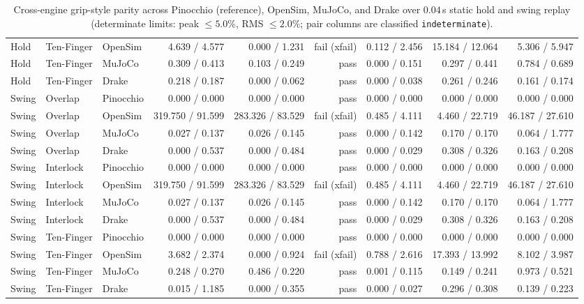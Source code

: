 \documentclass[11pt,a4paper]{article}
\begin{document}
\begin{table}[htbp]
\begin{tabular}{lllrrrrrr}
Hold & Ten-Finger & OpenSim & 4.639 / 4.577 & 0.000 / 1.231 & fail (xfail) & 0.112 / 2.456 & 15.184 / 12.064 & 5.306 / 5.947 \\
Hold & Ten-Finger & MuJoCo & 0.309 / 0.413 & 0.103 / 0.249 & pass & 0.000 / 0.151 & 0.297 / 0.441 & 0.784 / 0.689 \\
Hold & Ten-Finger & Drake & 0.218 / 0.187 & 0.000 / 0.062 & pass & 0.000 / 0.038 & 0.261 / 0.246 & 0.161 / 0.174 \\
\midrule
Swing & Overlap & Pinocchio & 0.000 / 0.000 & 0.000 / 0.000 & pass & 0.000 / 0.000 & 0.000 / 0.000 & 0.000 / 0.000 \\
Swing & Overlap & OpenSim & 319.750 / 91.599 & 283.326 / 83.529 & fail (xfail) & 0.485 / 4.111 & 4.460 / 22.719 & 46.187 / 27.610 \\
Swing & Overlap & MuJoCo & 0.027 / 0.137 & 0.026 / 0.145 & pass & 0.000 / 0.142 & 0.170 / 0.170 & 0.064 / 1.777 \\
Swing & Overlap & Drake & 0.000 / 0.537 & 0.000 / 0.484 & pass & 0.000 / 0.029 & 0.308 / 0.326 & 0.163 / 0.208 \\
\midrule
Swing & Interlock & Pinocchio & 0.000 / 0.000 & 0.000 / 0.000 & pass & 0.000 / 0.000 & 0.000 / 0.000 & 0.000 / 0.000 \\
Swing & Interlock & OpenSim & 319.750 / 91.599 & 283.326 / 83.529 & fail (xfail) & 0.485 / 4.111 & 4.460 / 22.719 & 46.187 / 27.610 \\
Swing & Interlock & MuJoCo & 0.027 / 0.137 & 0.026 / 0.145 & pass & 0.000 / 0.142 & 0.170 / 0.170 & 0.064 / 1.777 \\
Swing & Interlock & Drake & 0.000 / 0.537 & 0.000 / 0.484 & pass & 0.000 / 0.029 & 0.308 / 0.326 & 0.163 / 0.208 \\
\midrule
Swing & Ten-Finger & Pinocchio & 0.000 / 0.000 & 0.000 / 0.000 & pass & 0.000 / 0.000 & 0.000 / 0.000 & 0.000 / 0.000 \\
Swing & Ten-Finger & OpenSim & 3.682 / 2.374 & 0.000 / 0.924 & fail (xfail) & 0.788 / 2.616 & 17.393 / 13.992 & 8.102 / 3.987 \\
Swing & Ten-Finger & MuJoCo & 0.248 / 0.270 & 0.486 / 0.220 & pass & 0.001 / 0.115 & 0.149 / 0.241 & 0.973 / 0.521 \\
Swing & Ten-Finger & Drake & 0.015 / 1.185 & 0.000 / 0.355 & pass & 0.000 / 0.027 & 0.296 / 0.308 & 0.139 / 0.223 \\
\bottomrule
\end{tabular}
\caption{Cross-engine grip-style parity across Pinocchio (reference), OpenSim, MuJoCo, and Drake over $0.04$\,s static hold and swing replay (determinate limits: peak $\le 5.0\%$, RMS $\le 2.0\%$; pair columns are classified \texttt{indeterminate}).}
\label{tab:g10_determinate_and_pair_parity}
\end{table}
\end{document}
